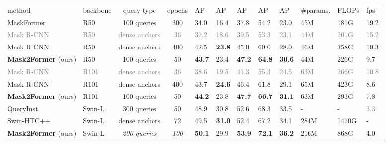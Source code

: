 \documentclass[10pt,twocolumn,letterpaper]{article}
\newcommand{\tablestyle}[2]{\setlength{\tabcolsep}{#1}\renewcommand{\arraystretch}{#2}\centering\footnotesize}
\newcommand{\demph}[1]{\textcolor{Gray}{#1}}
\newcommand{\modelname}{Mask2Former\xspace}
\begin{document}
\begin{table*}[t]
  \centering

  \tablestyle{4pt}{1.2}\scriptsize\begin{tabular}{l| lcc | x{20}x{20}x{20}x{20} | x{30} |x{24}x{24}x{18}}
  method & backbone & query type & epochs & AP & AP & AP & AP & AP & \#params. & FLOPs & fps \\
  \shline
  MaskFormer~\cite{cheng2021maskformer} & R50 & 100 queries & 300 & 34.0 & 16.4 & 37.8 & 54.2 & 23.0 & \phantom{0}45M & \phantom{0}181G & 19.2 \\
  \demph{Mask R-CNN~\cite{he2017mask}} & \demph{R50} & \demph{dense anchors} & \demph{36} & \demph{37.2} & \demph{18.6} & \demph{39.5} & \demph{53.3} & \demph{23.1} & \demph{\phantom{0}44M} & \demph{\phantom{0}201G} & \demph{15.2} \\
  Mask R-CNN~\cite{he2017mask,ghiasi2021simple,du2021simple} & R50 & dense anchors & 400 & 42.5 & \textbf{23.8} & 45.0 & 60.0 & 28.0 & \phantom{0}46M & \phantom{0}358G & 10.3 \\
  \textbf{\modelname} (ours) & R50 & 100 queries & 50 & \textbf{43.7} & 23.4 & \textbf{47.2} & \textbf{64.8} & \textbf{30.6} & \phantom{0}44M & \phantom{0}226G & \phantom{0}9.7 \\
  \hline
  \demph{Mask R-CNN~\cite{he2017mask}} & \demph{R101} & \demph{dense anchors} & \demph{36} & \demph{38.6} & \demph{19.5} & \demph{41.3} & \demph{55.3} & \demph{24.5} & \demph{\phantom{0}63M} & \demph{\phantom{0}266G} & \demph{10.8} \\
  Mask R-CNN~\cite{he2017mask,ghiasi2021simple,du2021simple} & R101 & dense anchors & 400 & 43.7 & \textbf{24.6} & 46.4 & 61.8 & 29.1 & \phantom{0}65M & \phantom{0}423G & \phantom{0}8.6 \\
  \textbf{\modelname} (ours) & R101 & 100 queries & 50 & \textbf{44.2} & 23.8 & \textbf{47.7} & \textbf{66.7} & \textbf{31.1} & \phantom{0}63M & \phantom{0}293G & \phantom{0}7.8 \\
  \hline
  QueryInst~\cite{QueryInst} & Swin-L & 300 queries & 50 & 48.9 & 30.8 & 52.6 & 68.3 & 33.5 & - & - & \phantom{0}\demph{3.3} \\
  Swin-HTC++~\cite{liu2021swin,chen2019hybrid} & Swin-L & dense anchors & 72 & 49.5 & \textbf{31.0} & 52.4 & 67.2 & 34.1 & 284M & 1470G & - \\
  \textbf{\modelname} (ours) & Swin-L & \emph{200 queries} & \emph{100} & \textbf{50.1} & 29.9 & \textbf{53.9} & \textbf{72.1} & \textbf{36.2} & 216M & \phantom{0}868G & \phantom{0}4.0 \\
  \end{tabular}
  \vspace{-1mm}


\end{table*}
\end{document}
